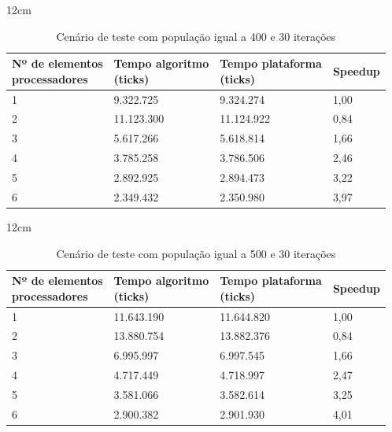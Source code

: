 \begin{table}[h]{12cm}
    \caption{Cenário de teste com população igual a 400 e 30 iterações}
    \label{tbl:taylor-vortex-parameters}
    \begin{tabular}{llll}
        \hline
        \shortstack[l]{Nº de elementos \\ processadores} & \shortstack[l]{Tempo algoritmo \\ (ticks)} & \shortstack[l]{Tempo plataforma \\ (ticks)} & Speedup \\
        \hline
        1 & 9.322.725  & 9.324.274  & 1,00 \\
        2 & 11.123.300 & 11.124.922 & 0,84 \\
        3 & 5.617.266  & 5.618.814  & 1,66 \\
        4 & 3.785.258  & 3.786.506  & 2,46 \\
        5 & 2.892.925  & 2.894.473  & 3,22 \\
        6 & 2.349.432  & 2.350.980  & 3,97 \\
        \hline
    \end{tabular}
\end{table}

\begin{table}[h]{12cm}
    \caption{Cenário de teste com população igual a 500 e 30 iterações}
    \label{tbl:taylor-vortex-parameters}
    \begin{tabular}{llll}
        \hline
        \shortstack[l]{Nº de elementos \\ processadores} & \shortstack[l]{Tempo algoritmo \\ (ticks)} & \shortstack[l]{Tempo plataforma \\ (ticks)} & Speedup \\
        \hline
        1 & 11.643.190 & 11.644.820 & 1,00 \\
        2 & 13.880.754 & 13.882.376 & 0,84 \\
        3 & 6.995.997  & 6.997.545  & 1,66 \\
        4 & 4.717.449  & 4.718.997  & 2,47 \\
        5 & 3.581.066  & 3.582.614  & 3,25 \\
        6 & 2.900.382  & 2.901.930  & 4,01 \\
        \hline
    \end{tabular}
\end{table}

